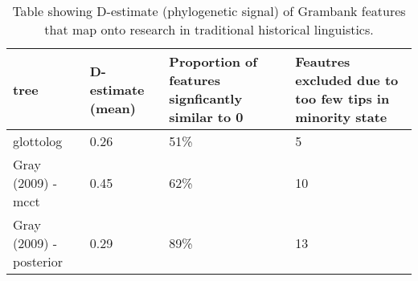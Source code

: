 \begin{table}[ht]
\centering
\begin{tabular}{p{5cm}p{3cm}p{3.5cm}p{3.5cm}}
  \hline
tree & D-estimate (mean) & Proportion of features signficantly similar to 0 & Feautres excluded due to too few tips in minority state \\ 
  \hline
glottolog & 0.26 & 51\% &   5 \\ 
  Gray (2009) - mcct & 0.45 & 62\% &  10 \\ 
  Gray (2009) - posterior & 0.29 & 89\% &  13 \\ 
   \hline
\end{tabular}
\caption{Table showing D-estimate (phylogenetic signal) of Grambank features that map onto research in traditional historical linguistics.} 
\label{d_estimate_summary}
\end{table}
